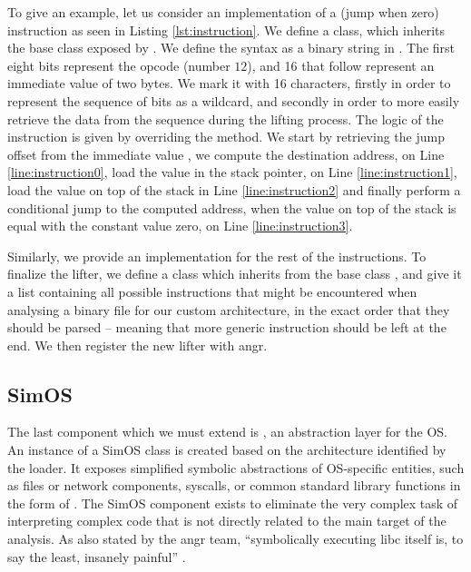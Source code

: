 To give an example, let us consider an implementation of a  (jump when zero) instruction as seen in Listing \ref{lst:instruction}. We define a class, which inherits the base  class exposed by . We define the syntax as a binary string in . The first eight bits represent the opcode (number $12$), and 16 that follow represent an immediate value of two bytes. We mark it with 16  characters, firstly in order to represent the sequence of bits as a wildcard, and secondly in order to more easily retrieve the data from the sequence during the lifting process. The logic of the instruction is given by overriding the  method. We start by retrieving the jump offset from the immediate value , we compute the destination address, on Line \ref{line:instruction0}, load the value in the stack pointer, on Line \ref{line:instruction1}, load the value on top of the stack in Line \ref{line:instruction2} and finally perform a conditional jump to the computed address, when the value on top of the stack is equal with the constant value zero, on Line \ref{line:instruction3}.

Similarly, we provide an implementation for the rest of the instructions. To finalize the lifter, we define a class which inherits from the base class , and give it a list containing all possible instructions that might be encountered when analysing a binary file for our custom architecture, in the exact order that they should be parsed -- meaning that more generic instruction should be left at the end. We then register the new lifter with angr.

\subsection{SimOS}

The last component which we must extend is , an abstraction layer for the \gls{OS}. An instance of a SimOS class is created based on the architecture identified by the loader. It exposes simplified symbolic abstractions of \gls{OS}-specific entities, such as files or network components, \glspl{syscall}, or common standard library functions in the form of  \cite{angr_tut}. The SimOS component exists to eliminate the very complex task of interpreting complex code that is not directly related to the main target of the analysis. As also stated by the angr team, ``symbolically executing libc itself is, to say the least, insanely painful'' \cite{angr_tut}. 

